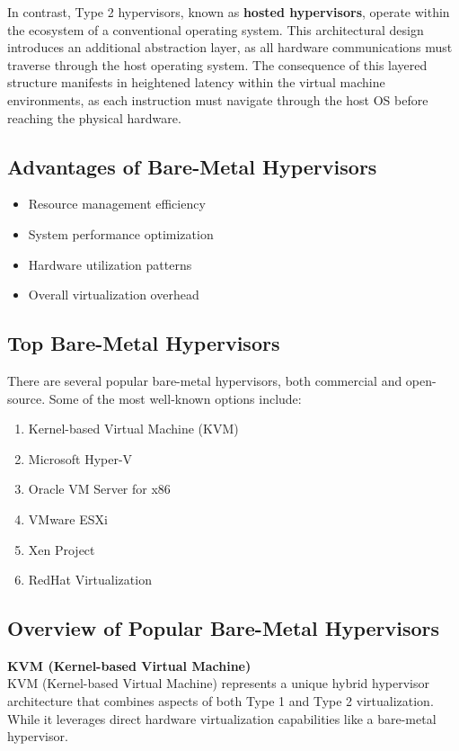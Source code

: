 \documentclass[12pt]{article}
\begin{document}
\begin{spacing}{1.5}
\begin{adjustwidth}{0cm}{0cm}
\begin{justify}
In contrast, Type 2 hypervisors, known as \textbf{hosted hypervisors}, operate within the ecosystem of a conventional operating system. This architectural design introduces an additional abstraction layer, as all hardware communications must traverse through the host operating system. The consequence of this layered structure manifests in heightened latency within the virtual machine environments, as each instruction must navigate through the host OS before reaching the physical hardware.

\subsection{Advantages of Bare-Metal Hypervisors}
\begin{itemize}
    \item Resource management efficiency
    \item System performance optimization
    \item Hardware utilization patterns
    \item Overall virtualization overhead
\end{itemize}

\subsection{Top Bare-Metal Hypervisors}
There are several popular bare-metal hypervisors, both commercial and open-source. Some of the most well-known options include:

\begin{enumerate}
    \item Kernel-based Virtual Machine (KVM)
    \item Microsoft Hyper-V
    \item Oracle VM Server for x86
    \item VMware ESXi
    \item Xen Project
    \item RedHat Virtualization
\end{enumerate}

\subsection{Overview of Popular Bare-Metal Hypervisors}

\textbf{KVM (Kernel-based Virtual Machine)} \\
KVM (Kernel-based Virtual Machine) represents a unique hybrid hypervisor architecture that combines aspects of both Type 1 and Type 2 virtualization. While it leverages direct hardware virtualization capabilities like a bare-metal hypervisor.


\end{justify}
\end{adjustwidth}
\end{spacing}
\end{document}
